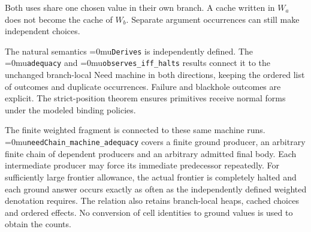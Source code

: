 \documentclass[11pt,a4paper]{article}
\newcommand{\name}[1]{\textup{\Urlmuskip=0mu\relax\nolinkurl{#1}}}
\newcommand{\diagramcaption}[1]{\par{\small\color{ink}#1\par}\medskip}
\begin{document}
\begin{center}
\end{center}

\begin{center}
\end{center}
\diagramcaption{Both uses share one chosen value in their own branch. A cache written
in $W_a$ does not become the cache of $W_b$. Separate argument occurrences can
still make independent choices.}

The natural semantics \name{Derives} is independently defined. The
\name{adequacy} and \name{observes_iff_halts} results connect it to the
unchanged branch-local Need machine in both directions, keeping the ordered
list of outcomes and duplicate occurrences. Failure and blackhole outcomes
are explicit. The strict-position theorem ensures primitives receive normal
forms under the modeled binding policies.

The finite weighted fragment is connected to these same machine runs.
\name{needChain_machine_adequacy} covers a finite ground producer, an arbitrary
finite chain of dependent producers and an arbitrary admitted final body.
Each intermediate producer may force its immediate predecessor repeatedly.
For sufficiently large frontier allowance, the actual frontier is completely
halted and each ground answer occurs exactly as often as the independently
defined weighted denotation requires. The relation also retains branch-local
heaps, cached choices and ordered effects. No conversion of cell identities
to ground values is used to obtain the counts.
\end{document}
